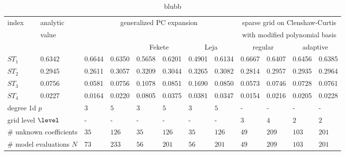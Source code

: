 
\begin{table}[!ht]
  \fontsize{8pt}{3ex}\selectfont
  \renewcommand{\arraystretch}{1.2}
  \begin{tabularx}{\textwidth}{XXXXXXXXXXXX}
    \toprule
    index &
    analytic &
    \multicolumn{6}{c}{generalized PC expansion} &
    \multicolumn{4}{c}{sparse grid on Clenshaw-Curtis} \\
    &
    value &
    & & & & & &
    \multicolumn{4}{c}{with modified polynomial basis} \\
    \hline
    & &
    \multicolumn{2}{c}{\citet{Sudret08Global}} &
    \multicolumn{2}{c}{Fekete} &
    \multicolumn{2}{c}{Leja} &
    \multicolumn{2}{c}{regular} &
    \multicolumn{2}{c}{adaptive} \\
    \toprule
    $ST_1$ & 0.6342 & 0.6644 & 0.6350 & 0.5658 & 0.6201 & 0.4901 & 0.6134 & 0.6667 & 0.6407 & 0.6456 & 0.6385 \\
    $ST_2$ & 0.2945 & 0.2611 & 0.3057 & 0.3209 & 0.3044 & 0.3265 & 0.3082 & 0.2814 & 0.2957 & 0.2935 & 0.2964 \\
    $ST_3$ & 0.0756 & 0.0581 & 0.0756 & 0.1078 & 0.0851 & 0.1690 & 0.0850 & 0.0573 & 0.0746 & 0.0728 & 0.0761 \\
    $ST_4$ & 0.0227 & 0.0164 & 0.0220 & 0.0805 & 0.0375 & 0.0381 & 0.0347 & 0.0154 & 0.0216 & 0.0205 & 0.0228 \\
    \hline
        \multicolumn{2}{l}{degree 1d $p$} &
    \multicolumn{1}{l}{$3$} &
    \multicolumn{1}{l}{$5$} &
    \multicolumn{1}{l}{$3$} &
    \multicolumn{1}{l}{$5$} &
    \multicolumn{1}{l}{$3$} &
    \multicolumn{1}{l}{$5$} &
    \multicolumn{1}{l}{-} &
    \multicolumn{1}{l}{-} &
    \multicolumn{1}{l}{-} &
    \multicolumn{1}{l}{-} \\
    \multicolumn{2}{l}{grid level $\level$} &
    \multicolumn{1}{l}{-} &
    \multicolumn{1}{l}{-} &
    \multicolumn{1}{l}{-} &
    \multicolumn{1}{l}{-} &
    \multicolumn{1}{l}{-} &
    \multicolumn{1}{l}{-} &
    \multicolumn{1}{l}{$3$} &
    \multicolumn{1}{l}{$4$} &
    \multicolumn{1}{l}{$2$} &
    \multicolumn{1}{l}{$2$} \\
    \multicolumn{2}{l}{\# unknown coefficients} &
    \multicolumn{1}{l}{$35$} &
    \multicolumn{1}{l}{$126$} &
    \multicolumn{1}{l}{$35$} &
    \multicolumn{1}{l}{$126$} &
    \multicolumn{1}{l}{$35$} &
    \multicolumn{1}{l}{$126$} &
    \multicolumn{1}{l}{$49$} &
    \multicolumn{1}{l}{$209$} &
    \multicolumn{1}{l}{$103$} &
    \multicolumn{1}{l}{$201$} \\
    \multicolumn{2}{l}{\# model evaluations $N$} &
    \multicolumn{1}{l}{$73$} &
    \multicolumn{1}{l}{$233$} &
    \multicolumn{1}{l}{$56$} &
    \multicolumn{1}{l}{$201$} &
    \multicolumn{1}{l}{$56$} &
    \multicolumn{1}{l}{$201$} &
    \multicolumn{1}{l}{$49$} &
    \multicolumn{1}{l}{$209$} &
    \multicolumn{1}{l}{$103$} &
    \multicolumn{1}{l}{$201$} \\
    \bottomrule
  \end{tabularx}
  \caption{blubb}
  \label{tab::sobolgfunction-reduced-model-anova}
\end{table}
